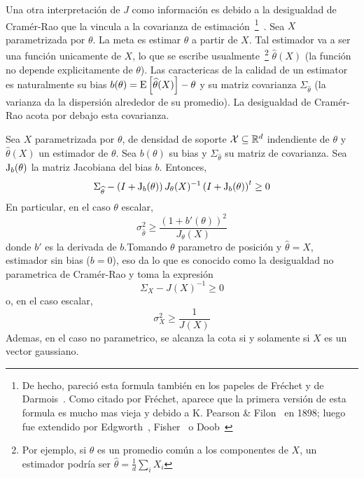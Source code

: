 Una otra interpretaci\'on  de $J$ como informaci\'on es  debido a la desigualdad
de  Cram\'er-Rao que  la vincula  a la  covarianza  de estimaci\'on~\footnote{De
  hecho,  pareci\'o esta  formula tambi\'en  en los  papeles de  Fr\'echet  y de
  Darmois~\cite{Fre43, Dar45}. Como citado por Fr\'echet, aparece que la primera
  versi\'on  de esta  formula  es mucho  mas vieja  y  debido a  K.  Pearson  \&
  Filon~\cite{PeaFil98} en 1898;  luego fue extendido por Edgworth~\cite{Edg08},
  Fisher~\cite{Fis25:07}  o   Doob~\cite{Doo36}}~\cite{Rao45,  Rao92,  RaoWis47,
  Cra46, Rio07,  CovTho06, Kay93, Bos07}.   Sea $X$ parametrizada  por $\theta$.
La  meta es  estimar $\theta$  a partir  de  $X$.  Tal  estimador va  a ser  una
funci\'on unicamente de $X$, lo que se escribe usualmente~\footnote{Por ejemplo,
  si $\theta$  es un  promedio com\'un  a los componentes  de $X$,  un estimador
  podr\'ia  ser $\widehat{\theta} =  \frac1d \sum_i  X_i$} $\widehat{\theta}(X)$
(la funci\'on  no depende explicitamente  de $\theta$).  Las caractericas  de la
calidad  de  un  estimator  es  naturalmente su  bias  $b(\theta)  =  \operatorname{E}\left[
  \widehat{\theta}(X)    \right]   -    \theta$   y    su    matriz   covarianza
$\Sigma_{\widehat{\theta}}$  (la varianza  da  la dispersi\'on  alrededor de  su
promedio). La desigualdad de Cram\'er-Rao acota por debajo esta covarianza.
%
\begin{teorema}
  Sea  $X$ parametrizada  por $\theta$,  de  densidad de  soporte $\mathcal{X}  \subseteq
  \mathbb{R}^d$  indendiente  de $\theta$  y  $\widehat{\theta}(X)$  un estimador  de
  $\theta$.  Sea $b(\theta)$ su  bias y $\Sigma_{\widehat{\theta}}$ su matriz de
  covarianza.   Sea   $\operatorname{J}_b(\theta)$  la   matriz  Jacobiana  del   bias  $b$.
  Entonces,
  \[
  \Sigma_{\widehat{\theta}} - \left( I + \operatorname{J}_b(\theta) \right) J_\theta(X)^{-1}
  \left( I + \operatorname{J}_b(\theta) \right)^t \ge 0
  \]
  En particular, en el  caso $\theta$ escalar,
  \[
  \sigma_{\widehat{\theta}}^2 \ge \frac{(1+b'(\theta))^2}{J_\theta(X)}
  \]
  donde  $b'$ es  la  derivada  de $b$.\newline  Tomando  $\theta$ parametro  de
  posici\'on y $\widehat{\theta}  = X$, estimador sin bias ($b =  0$), eso da lo
  que es conocido  como la desigualdad no parametrica de  Cram\'er-Rao y toma la
  expresi\'on
  \[
  \Sigma_X - J(X)^{-1} \ge 0
  \]
  o, en el caso escalar,
  \[
  \sigma_X^2 \ge \frac{1}{J(X)}
  \]
  Ademas, en el caso no parametrico, se alcanza la cota si y solamente si $X$ es
  un vector gaussiano.
\end{teorema}
